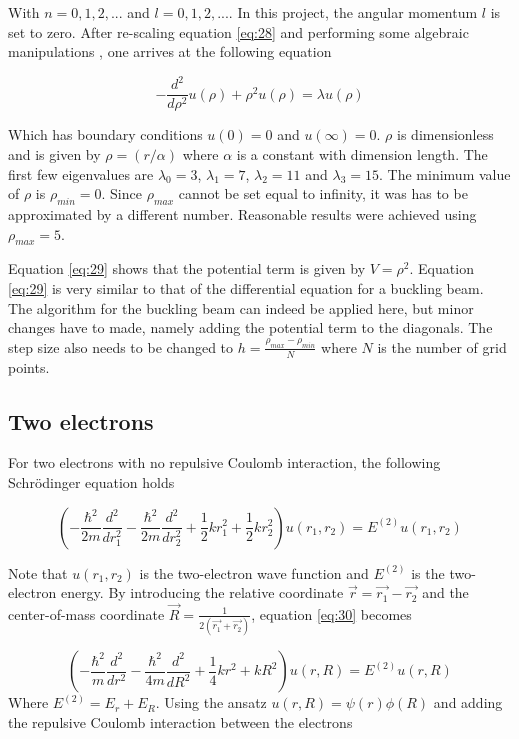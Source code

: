 \documentclass[a4paper,11pt]{article}
\begin{document}
With $n = 0,1,2,...$ and $l = 0,1,2,...$. In this project, the angular momentum $l$ is set to zero. After re-scaling equation \ref{eq:28} and performing some algebraic manipulations \cite{Project2}, one arrives at the following equation 

\begin{equation}\label{eq:29}
-\frac{d^2}{d\rho^2}u(\rho) + \rho^2 u(\rho) = \lambda u(\rho) 
\end{equation}

Which has boundary conditions $u(0) = 0$ and $u(\infty) = 0$. $\rho$ is dimensionless and is given by $\rho = (r/\alpha)$ where $\alpha$ is a constant with dimension length. The first few eigenvalues are $\lambda_0 = 3$, $\lambda_1 = 7$, $\lambda_2 = 11$ and $\lambda_3 = 15$. The minimum value of $\rho$ is $\rho_{min} = 0$. Since  $\rho_{max}$ cannot be set equal to infinity, it was has to be approximated by a different number. Reasonable results were achieved using $\rho_{max} = 5$. 

Equation \ref{eq:29} shows that the potential term is given by $V=\rho^2$. Equation \ref{eq:29} is very similar to that of the differential equation for a buckling beam. The algorithm for the buckling beam can indeed be applied here, but minor changes have to made, namely adding the potential term to the diagonals. The step size also needs to be changed to $h = \frac{\rho_{max}-\rho_{min}}{N}$ where $N$ is the number of grid points. 

\subsection{Two electrons}

For two electrons with no repulsive Coulomb interaction, the following Schrödinger equation holds \cite{Project2}

\begin{equation}\label{eq:30}
\left(- \frac{\hbar^2}{2m} \frac{d^2}{dr_1^2} - \frac{\hbar^2}{2m}\frac{d^2}{dr_2^2} + \frac{1}{2}kr_1^2 + \frac{1}{2}kr_2^2 \right) u(r_1, r_2) = E^{(2)}u(r_1,r_2)
\end{equation}

Note that $u(r_1,r_2)$ is the two-electron wave function and $E^{(2)}$ is the two-electron energy. By introducing the relative coordinate $\vec{r} = \vec{r_1} - \vec{r_2}$ and the center-of-mass coordinate $\vec{R} = \frac{1}{2(\vec{r_1} + \vec{r_2})}$, equation \ref{eq:30} becomes 

\begin{equation}\label{eq:31}
\left(-\frac{\hbar^2}{m}\frac{d^2}{dr^2} - \frac{\hbar^2}{4m}\frac{d^2}{dR^2} + \frac{1}{4}kr^2 + kR^2 \right) u(r, R) = E^{(2)}u(r,R)
\end{equation}
Where $E^{(2)} = E_r + E_R$. Using the ansatz $u(r,R) = \psi(r) \phi(R)$ and adding the repulsive Coulomb interaction between the electrons 
\end{document}
